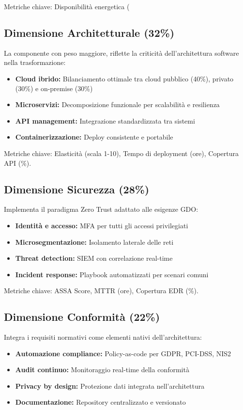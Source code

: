Metriche chiave: Disponibilità energetica (%

\subsection{Dimensione Architetturale (32\%)}
\label{subsec:architetturale}

La componente con peso maggiore, riflette la criticità dell'architettura software nella trasformazione:
\begin{itemize}
\item \textbf{Cloud ibrido:} Bilanciamento ottimale tra cloud pubblico (40\%), privato (30\%) e on-premise (30\%)
\item \textbf{Microservizi:} Decomposizione funzionale per scalabilità e resilienza
\item \textbf{API management:} Integrazione standardizzata tra sistemi
\item \textbf{Containerizzazione:} Deploy consistente e portabile
\end{itemize}

Metriche chiave: Elasticità (scala 1-10), Tempo di deployment (ore), Copertura API (\%).

\subsection{Dimensione Sicurezza (28\%)}
\label{subsec:sicurezza}

Implementa il paradigma Zero Trust adattato alle esigenze GDO:
\begin{itemize}
\item \textbf{Identità e accesso:} MFA per tutti gli accessi privilegiati
\item \textbf{Microsegmentazione:} Isolamento laterale delle reti
\item \textbf{Threat detection:} SIEM con correlazione real-time
\item \textbf{Incident response:} Playbook automatizzati per scenari comuni
\end{itemize}

Metriche chiave: ASSA Score, MTTR (ore), Copertura EDR (\%).

\subsection{Dimensione Conformità (22\%)}
\label{subsec:conformita}

Integra i requisiti normativi come elementi nativi dell'architettura:
\begin{itemize}
\item \textbf{Automazione compliance:} Policy-as-code per GDPR, PCI-DSS, NIS2
\item \textbf{Audit continuo:} Monitoraggio real-time della conformità
\item \textbf{Privacy by design:} Protezione dati integrata nell'architettura
\item \textbf{Documentazione:} Repository centralizzato e versionato
\end{itemize}

